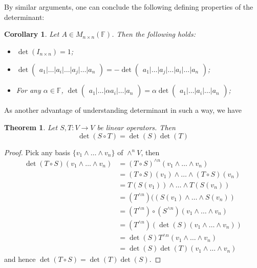 \documentclass[11pt,openany]{book}
\theoremstyle{plain}
\newtheorem{theorem}{Theorem}[chapter]
\newtheorem{corollary}[corollary]{Corollary}
\theoremstyle{definition}
\theoremstyle{remark}
\begin{document}
By similar arguments, one can conclude the following defining properties of the determinant:
\begin{corollary}
    Let $A \in M_{n\times n}(\mathbb{F})$. Then the following holds:
\begin{itemize}
    \item $\det(I_{n\times n})= 1$;
    \item $\det\begin{pmatrix} a_1 | \dots  | a_i | \dots | a_j | \dots | a_n \end{pmatrix} = - \det\begin{pmatrix} a_1 | \dots  | a_j | \dots | a_i | \dots | a_n \end{pmatrix}$;
    \item For any $\alpha \in \mathbb{F}$, $\det\begin{pmatrix} a_1 | \dots  | \alpha a_i | \dots | a_n \end{pmatrix} = \alpha \det\begin{pmatrix} a_1 | \dots  | a_i | \dots | a_n \end{pmatrix}$;
\end{itemize}
\end{corollary}

As another advantage of understanding determinant in such a way, we have
\begin{theorem}
    Let $S, T: V \to V$ be linear operators. Then
    $$\det(S \circ T) = \det(S)\det(T)$$
\end{theorem}
\begin{proof}
Pick any basis $\{v_1 \wedge \dots \wedge v_n\}$ of $\wedge^n V$, then
\begin{align*}
\det(T \circ S)(v_1 \wedge \dots \wedge v_n) &= (T \circ S)^{\wedge n}(v_1 \wedge \dots \wedge v_n) \\
&= (T \circ S)(v_1) \wedge \dots \wedge (T \circ S)(v_n) \\
&= T(S(v_1)) \wedge \dots \wedge T(S(v_n)) \\
&= (T^{\wedge n}) ((S(v_1) \wedge \dots \wedge S(v_n))\\
&= (T^{\wedge n}) \circ (S^{\wedge n}) (v_1 \wedge \dots \wedge v_n)\\
&= (T^{\wedge n})(\det(S)(v_1 \wedge \dots \wedge v_n))\\
&= \det(S)T^{\wedge n}(v_1 \wedge \dots \wedge v_n)\\
&= \det(S)\det(T)(v_1 \wedge \dots \wedge v_n)
\end{align*}
and hence $\det(T \circ S) = \det(T)\det(S)$.
\end{proof}
\end{document}
